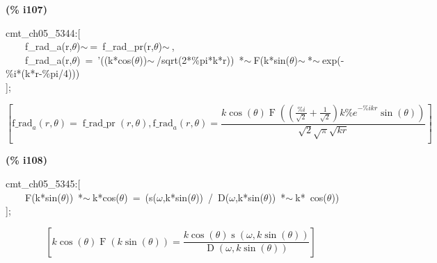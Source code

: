 \documentclass[fleqn]{article}
\begin{document}
\noindent
\begin{minipage}[t]{4.000000em}\color{red}\bfseries
(\% i107)	
\end{minipage}
\begin{minipage}[t]{\textwidth}\color{blue}
cmt\_ch05\_5344:[\\
\ \ \ \ f\_rad\_a(r,\ensuremath{\theta})\ensuremath{\sim\ }=\ f\_rad\_pr(r,\ensuremath{\theta})\ensuremath{\sim\ },\ \\
\ \ \ \ f\_rad\_a(r,\ensuremath{\theta})\ =\ '((k*cos(\ensuremath{\theta}))\ensuremath{\sim\ }/sqrt(2*\%pi*k*r))\ *\ensuremath{\sim\ }F(k*sin(\ensuremath{\theta})\ensuremath{\sim\ }*\ensuremath{\sim\ }exp(-\%i*(k*r-\%pi/4)))\\
];
\end{minipage}
\[\displaystyle \tag{\% o107} 
\operatorname{[}{{\ensuremath{\mathrm{f\_ rad}}}_a}\left( r\operatorname{,}\theta \right) =\operatorname{f\_ rad\_ pr}\left( r\operatorname{,}\theta \right) \operatorname{,}{{\ensuremath{\mathrm{f\_ rad}}}_a}\left( r\operatorname{,}\theta \right) =\frac{k \cos{\left( \theta \right) } \operatorname{F}\left( \left( \frac{\% i}{\sqrt{2}}+\frac{1}{\sqrt{2}}\right)  k {{\% e}^{-\% i k r}} \sin{\left( \theta \right) }\right) }{\sqrt{2} \sqrt{\ensuremath{\pi} } \sqrt{k r}}\operatorname{]}\mbox{}
\]


\noindent
\begin{minipage}[t]{4.000000em}\color{red}\bfseries
(\% i108)	
\end{minipage}
\begin{minipage}[t]{\textwidth}\color{blue}
cmt\_ch05\_5345:[\\
\ \ \ \ F(k*sin(\ensuremath{\theta}))\ *\ensuremath{\sim\ }k*cos(\ensuremath{\theta})\ =\ (s(\ensuremath{\omega},k*sin(\ensuremath{\theta}))\ /\ D(\ensuremath{\omega},k*sin(\ensuremath{\theta}))\ *\ensuremath{\sim\ }k*\ cos(\ensuremath{\theta}))\\
];
\end{minipage}
\[\displaystyle \tag{\% o108} 
\left[ k \cos{\left( \theta \right) } \operatorname{F}\left( k \sin{\left( \theta \right) }\right) =\frac{k \cos{\left( \theta \right) } \operatorname{s}\left( \omega \operatorname{,}k \sin{\left( \theta \right) }\right) }{\operatorname{D}\left( \omega \operatorname{,}k \sin{\left( \theta \right) }\right) }\right] \mbox{}
\]
\end{document}
